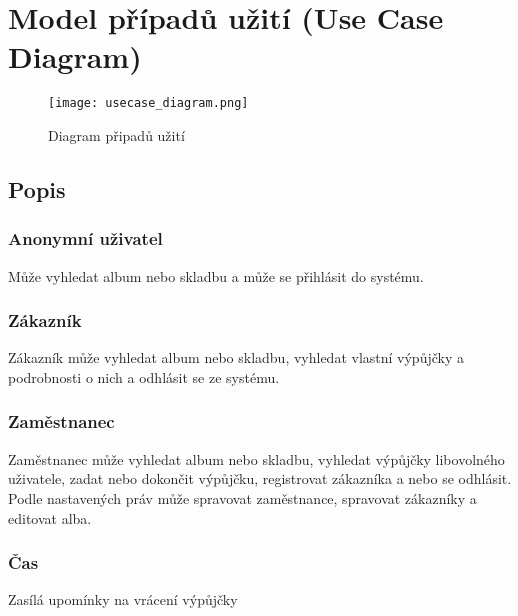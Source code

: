 \section{Model případů užití (Use Case Diagram)}

\begin{figure}[H] 
  \centering
  \texttt{[image: usecase\_diagram.png]}
  \caption{Diagram připadů užití}
\end{figure}


\subsection{Popis}

\subsubsection{Anonymní uživatel}
Může vyhledat album nebo skladbu a může se přihlásit do systému.

\subsubsection{Zákazník}
Zákazník může vyhledat album nebo skladbu, vyhledat vlastní výpůjčky a podrobnosti o nich a odhlásit se ze systému.

\subsubsection{Zaměstnanec}
Zaměstnanec může vyhledat album nebo skladbu, vyhledat výpůjčky libovolného uživatele, zadat nebo dokončit výpůjčku, registrovat zákazníka a nebo se odhlásit. \\
Podle nastavených práv může spravovat zaměstnance, spravovat zákazníky a editovat alba.

\subsubsection{Čas}
Zasílá upomínky na vrácení výpůjčky
